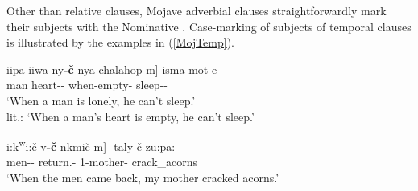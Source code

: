 
Other than relative clauses, Mojave adverbial clauses straightforwardly mark their subjects with the Nominative .
Case-marking of subjects of temporal clauses is illustrated by the examples in (\ref{MojTemp}).  

\begin{exe}\ex\label{MojTemp}
\begin{xlist}
\ex\gll  {\rm[}\textglotstop iipa iiwa-ny\textbf{-\v c} nya-chalahop-m{\rm]} isma-mot-e\\
\hspaceThis{[}man heart-\dem{}-\nom{} when-empty-\dsbj{} sleep-\Neg{}-\fut{}\\
\glt `When a man is lonely, he can't sleep.'\\
lit.: `When a man's heart is empty, he can't sleep.' %

\ex\gll  {\rm[}\textglotstop i:k\textsuperscript{w}i:\v c-v\textschwa\textbf{-\v c} n\textschwa k\textschwa mi\v c-m{\rm]} \textglotstop\textschwa-taly-\v c zu:pa:\\
\hspaceThis{[}men-\dem{}-\nom{} return.\pl{}-\dsbj{} 1-mother-\nom{} crack\_acorns\\
\glt `When the men came back, my mother cracked acorns.' %
\end{xlist}
\end{exe}

